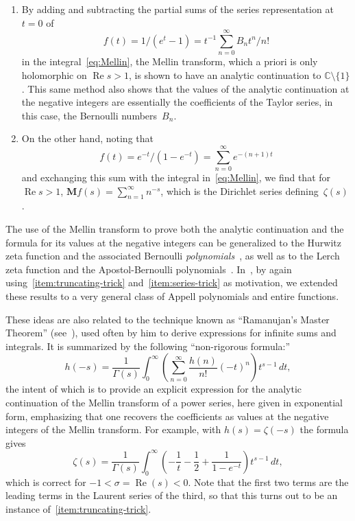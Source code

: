 \documentclass[11pt,a4paper]{amsart}
\newcommand{\C}{\mathbb{C}}
\renewcommand{\Re}{\operatorname{Re}}
\newcommand{\M}{\mathbf{M}}
\theoremstyle{plain}
\theoremstyle{plain}
\theoremstyle{plain}
\theoremstyle{definition}
\theoremstyle{remark}
\begin{document}
\begin{enumerate}[label=\Alph*., ref=\Alph*]
\item
\label{item:truncating-trick}
By adding and subtracting the partial sums of the series representation at $t = 0$ of 
\[
  f(t) = 1/(e^{t}-1) = t^{-1} \sum_{n=0}^{\infty} B_{n} t^{n}/n!
\]
in the integral~\eqref{eq:Mellin}, the Mellin transform, which a priori is only holomorphic on $\Re s > 1$, is shown to have an analytic continuation to $\C \setminus \{1\}$. This same method also shows that the values of the analytic continuation at the negative integers are essentially the coefficients of the Taylor series, in this case, the Bernoulli numbers~$B_{n}$.

\item
\label{item:series-trick}
On the other hand, noting that 
\[
  f(t) = e^{-t}/(1 - e^{-t}) = \sum_{n=0}^{\infty} e^{-(n+1)t}
\]
and exchanging this sum with the integral in~\eqref{eq:Mellin}, we find that for $\Re s > 1$, $\M{f}(s) = \sum_{n=1}^{\infty} n^{-s}$, which is the Dirichlet series defining~$\zeta(s)$.
\end{enumerate}


The use of the Mellin transform to prove both the analytic continuation and the formula for its values at the negative integers can be generalized to the Hurwitz zeta function and the associated Bernoulli \emph{polynomials}~\cite{Apostol-ANT}, as well as to the Lerch zeta function and the Apostol-Bernoulli polynomials~\cite{Apostol-Lerch}. In~\cite{AppellSpecialValues}, by again using~\eqref{item:truncating-trick} and~\eqref{item:series-trick} as motivation, we extended these results to a very general class of Appell polynomials and entire functions.


These ideas are also related to the technique known as ``Ramanujan's Master Theorem'' (see~\cite{Amdeberhan}), used often by him to derive expressions for infinite sums and integrals. It is summarized by the following ``non-rigorous formula:''
\begin{equation*}
  h(-s)
  = \frac{1}{\Gamma(s)}
  \int_{0}^{\infty} \left(\sum_{n=0}^{\infty} \frac{h(n)}{n!} (-t)^{n}\right) t^{s-1} \, dt,
\end{equation*}
the intent of which is to provide an explicit expression for the analytic continuation of the Mellin transform of a power series, here given in exponential form, emphasizing that one recovers the coefficients as values at the negative integers of the Mellin transform. For example, with $h(s) = \zeta(-s)$ the formula gives
\[
  \zeta(s) = \frac{1}{\Gamma(s)} \int_{0}^{\infty} \left(-\frac{1}{t} 
  - \frac{1}{2} + \frac{1}{1-e^{-t}}\right) t^{s-1} \, dt,
\]
which is correct for $-1 < \sigma = \Re(s) < 0$. Note that the first two terms are the leading terms in the Laurent series of the third, so that this turns out to be an instance of~\eqref{item:truncating-trick}.
\end{document}
